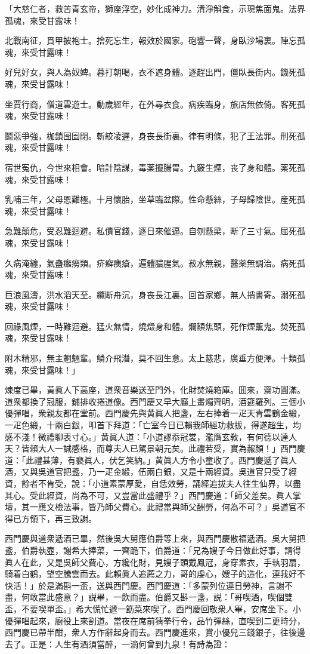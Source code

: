 \begin{myquote}
「大慈仁者，救苦青玄帝，獅座浮空，妙化成神力。清淨斛食，示現焦面鬼。法界孤魂，來受甘露味！　

北戰南征，貫甲披袍士。捨死忘生，報效於國家。砲響一聲，身臥沙場裏。陣忘孤魂，來受甘露味！

好兒好女，與人為奴婢。暮打朝喝，衣不遮身體。逐趕出門，僵臥長街内。饑死孤魂，來受甘露味！

坐賈行商，僧道雲遊士。動歲經年，在外尋衣食。病疾臨身，旅店無依倚。客死孤魂，來受甘露味！

鬬惡爭強，枷鎖囹圄閉。斬絞凌遲，身丧長街裏。律有明條，犯了王法罪。刑死孤魂，來受甘露味！

宿世寃仇，今世來相會。暗計陰謀，毒薬攛腸胃。九竅生煙，丧了身和體。薬死孤魂，來受甘露味！

乳哺三年，父母恩難極。十月懷胎，坐草臨盆際。性命懸絲，子母歸陰世。産死孤魂，來受甘露味！

急難顛危，受忍難迴避。私債官錢，逐日來催逼。自刎懸梁，断了三寸氣。屈死孤魂，來受甘露味！

久病淹纏，氣蠱癱癆類。疥癬痍瘡，遍體膿腥氣。菽水無親，醫薬無調治。病死孤魂，來受甘露味！

巨浪風濤，洪水滔天至。纜断舟沉，身丧長江裏。回首家鄉，無人捎書寄。溺死孤魂，來受甘露味！

回祿風煙，一時難迴避。猛火無情，燒燬身和體。爛額焦頭，死作煙薰鬼。焚死孤魂，來受甘露味！

附木精邪，無主魍魎輩。鱗介飛潛，莫不回生意。太上慈悲，廣垂方便澤。十類孤魂，來受甘露味！」
\end{myquote}

煉度已畢，黃眞人下高座，道衆音樂送至門外，化財焚燒箱庫。囬來，齋功圓滿。道衆都換了冠服，鋪排收捲道像。西門慶又早大廳上畫燭齊明，酒筵羅列。三個小優彈唱，衆親友都在堂前。西門慶先與黄眞人把盞，左右捧着一疋天青雲鶴金緞，一疋色緞，十兩白銀，叩首下拜道：「亡室今日已賴我師經功救拔，得遂超生，均感不淺！微禮聊表寸心。」黄眞人道：「小道謬忝冠裳，濫膺玄敎，有何德以達人天？皆賴大人一誠感格，而尊夫人已駕景朝元矣。此禮若受，實為赧顏！」西門慶道：「此禮甚薄，有褻眞人，伏乞笑納。」黄眞人方令小童收了。西門慶遞了眞人酒，又與吳道官把盞，乃一疋金緞，伍兩白銀，又是十兩經資。吳道官只受了經資，餘者不肯受，說：「小道素蒙厚愛，自恁效勞，誦經追拔夫人往生仙界，以盡其心。受此經資，尚為不可，又豈當此盛禮乎？」西門慶道：「師父差矣。眞人掌壇，其一應文檢法事，皆乃師父費心。此禮當與師父酬勞，何為不可？」吳道官不得已方領下，再三致謝。

西門慶與道衆遞酒已畢，然後吳大舅應伯爵等上來，與西門慶散福遞酒。吳大舅把盞，伯爵執壺，謝希大捧菜，一齊跪下，伯爵道：「兄為嫂子今日做此好事，請得眞人在此，又是吳師父費心，方纔化財，見嫂子頭戴鳳冠，身穿素衣，手執羽扇，騎着白鶴，望空騰雲而去。此賴眞人追薦之力，哥的虔心，嫂子的造化，連我好不快活！」於是滿斟一盃，送與西門慶。西門慶道：「多蒙列位連日勞神，言謝不盡，何敢當此盛意？」説畢，一飲而盡。伯爵又斟一盞，説：「哥喫酒，喫個雙盃，不要喫單盃。」希大慌忙遞一筯菜來喫了。西門慶回敬衆人畢，安席坐下。小優彈唱起來，廚役上來割道。當夜在席前猜拳行令，品竹彈絲，直喫到二更時分，西門慶已帶半酣，衆人方作辭起身而去。西門慶進來，賞小優兒三錢銀子，往後邊去了。正是：人生有酒須當醉，一滴何曾到九泉！有詩為證：

